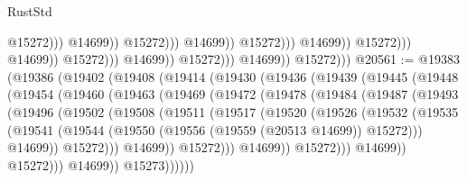 \begin{lexlean}{RustStd}
\begin{coremodule}
                                                                      @15272)))
                                                                @14699))
                                                            @15272)))
                                                      @14699))
                                                  @15272)))
                                            @14699))
                                        @15272)))
                                  @14699))
                              @15272)))
                        @14699))
                    @15272)))
              @14699))
          @15272)))
@20561 := @19383
    (@19386
      (@19402
        (@19408
          (@19414
            (@19430
              (@19436
                (@19439
                  (@19445
                    (@19448
                      (@19454
                        (@19460
                          (@19463
                            (@19469
                              (@19472
                                (@19478
                                  (@19484
                                    (@19487
                                      (@19493
                                        (@19496
                                          (@19502
                                            (@19508
                                              (@19511
                                                (@19517
                                                  (@19520
                                                    (@19526
                                                      (@19532
                                                        (@19535
                                                          (@19541
                                                            (@19544
                                                              (@19550
                                                                (@19556
                                                                  (@19559 (@20513 @14699))
                                                                  @15272)))
                                                            @14699))
                                                        @15272)))
                                                  @14699))
                                              @15272)))
                                        @14699))
                                    @15272)))
                              @14699))
                          @15272)))
                    @14699))
                @15273))))))

\end{coremodule}
\end{lexlean}
